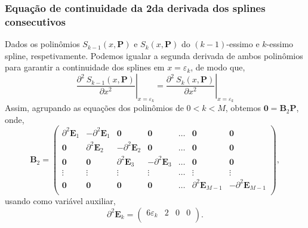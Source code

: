 \documentclass[a4paper,10pt]{article}
\begin{document}
\subsubsection{Equação de continuidade da 2da derivada dos splines consecutivos}
\label{subsubsec:part2}
Dados os polinômios $S_{k-1}(x,\mathbf{P})$ e $S_{k}(x,\mathbf{P})$ do $(k-1)$-essimo e $k$-essimo spline,
respetivamente. Podemos igualar a segunda derivada de ambos polinômios para garantir a continuidade dos splines em $x=\varepsilon_{k}$, 
de modo que,
\begin{equation}
 \left.\frac{\partial^2~S_{k-1}(x,\mathbf{P})}{\partial x^2}\right|_{x=\varepsilon_{k}} = 
 \left.\frac{\partial^2~S_{k}  (x,\mathbf{P})}{\partial x^2}\right|_{x=\varepsilon_{k}}
\end{equation}
Assim, agrupando as equações dos polinômios de  $0<k<M$, obtemos $\mathbf{0}=\mathbf{B}_2 \mathbf{P}$, onde,
\begin{equation}
\mathbf{B}_2 =\left(\begin{matrix}
\partial^2\mathbf{E}_1 & -\partial^2\mathbf{E}_1   & \mathbf{0}    &  \mathbf{0}   & \dots & \mathbf{0} & \mathbf{0}\\
\mathbf{0}   &  \partial^2\mathbf{E}_2   & -\partial^2\mathbf{E}_2 &  \mathbf{0}   & \dots & \mathbf{0} & \mathbf{0}\\
\mathbf{0}   &  \mathbf{0}     &  \partial^2\mathbf{E}_3 & -\partial^2\mathbf{E}_3 & \dots & \mathbf{0} & \mathbf{0}\\
\vdots       &  \vdots         &  \vdots       &  \vdots       & \dots & \vdots     & \vdots\\
\mathbf{0}   &  \mathbf{0}     &  \mathbf{0}   &  \mathbf{0}   & \dots & \partial^2\mathbf{E}_{M-1} & -\partial^2\mathbf{E}_{M-1} \\
\end{matrix}\right),
\end{equation}
usando como variável auxiliar,
\begin{equation}
\partial^2\mathbf{E}_k =\left(\begin{matrix}
6\varepsilon_k & 2   & 0 & 0  \\
\end{matrix}\right).
\end{equation}
\end{document}
